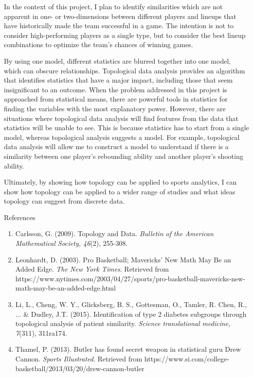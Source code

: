 \documentclass[12pt, letterpaper]{article}
\begin{document}
In the context of this project, I plan to identify similarities which are not apparent in one- or two-dimensions between different players and lineups that have historically made the team successful in a game. The intention is not to consider high-performing players as a single type, but to consider the best lineup combinations to optimize the team's chances of winning games. 

By using one model, different statistics are blurred together into one model, which can obscure relationships. Topological data analysis provides an algorithm that identifies statistics that have a major impact, including those that seem insignificant to an outcome. When the problem addressed in this project is approached from statistical means, there are powerful tools in statistics for finding the variables with the most explanatory power. However, there are situations where topological data analysis will find features from the data that statistics will be unable to see. This is because statistics has to start from a single model, whereas topological analysis suggests a model. For example, topological data analysis will allow me to construct a model to understand if there is a similarity between one player's rebounding ability and another player's shooting ability.
 
Ultimately, by showing how topology can be applied to sports analytics, I can show how topology can be applied to a wider range of studies and what ideas topology can suggest from discrete data.

\medskip

References
\begin{enumerate}[noitemsep]
\item Carlsson, G. (2009). Topology and Data. \textit{Bulletin of the American Mathematical Society, 46}(2), 255-308.
\item Leonhardt, D. (2003). Pro Basketball; Mavericks’ New Math May Be an Added Edge. \textit{The New York Times}. Retrieved from https://www.nytimes.com/2003/04/27/sports/pro-basketball-mavericks-new-math-may-be-an-added-edge.html
\item Li, L., Cheng, W. Y., Glicksberg, B. S., Gottesman, O., Tamler, R. Chen, R., ... \& Dudley, J.T. (2015). Identification of type 2 diabetes subgroups through topological
analysis of patient similarity. \textit{Science translational medicine, 7}(311), 311ra174.
\item Thamel, P. (2013). Butler has found secret weapon in statistical guru Drew Cannon. \textit{Sports Illustrated}. Retrieved from https://www.si.com/college-basketball/2013/03/20/drew-cannon-butler
\end{enumerate}
\end{document}
